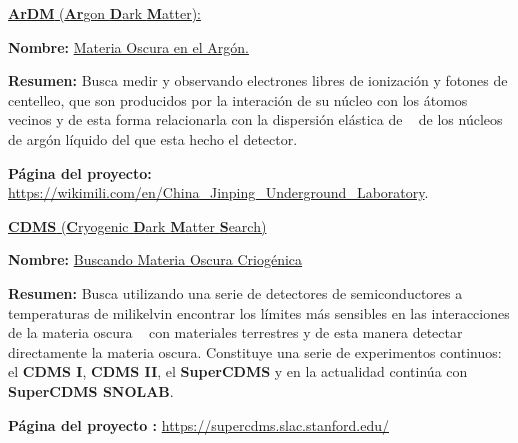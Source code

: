 \href{https://en.wikipedia.org/wiki/ArDM}{\textbf{ArDM} (\textbf{Ar}gon \textbf{D}ark \textbf{M}atter): }
\begin{itemize_f}
\item \textbf{Nombre:} \href{https://en.wikipedia.org/wiki/ArDM}{Materia Oscura en el Argón.}
\item \textbf{Resumen:} Busca medir y observando electrones libres de ionización y fotones de centelleo, que son producidos por la interación de su núcleo con los átomos vecinos y de esta forma relacionarla con la dispersión elástica de \WIMP ~ de los núcleos de argón líquido del que esta hecho el detector.
\item \textbf{Página del proyecto:} \href{https://wikimili.com/en/China_Jinping_Underground_Laboratory}{https://wikimili.com/en/China\_Jinping\_Under\-ground\_La\-bo\-ra\-to\-ry}.
\end{itemize_f}


\href{https://en.wikipedia.org/wiki/Cryogenic_Dark_Matter_Search}{\textbf{CDMS} (\textbf{C}ryogenic \textbf{D}ark \textbf{M}atter \textbf{S}earch)}
\begin{itemize_f}
\item \textbf{Nombre:} \href{https://en.wikipedia.org/wiki/Cryogenic_Dark_Matter_Search}{Buscando Materia Oscura Criogénica}
\item \textbf{Resumen:} Busca utilizando una serie de detectores de semiconductores a temperaturas de milikelvin encontrar los límites más sensibles en las interacciones de la materia oscura \WIMP~  con materiales terrestres y de esta manera detectar directamente la materia oscura. Constituye una serie de experimentos continuos: el \textbf{CDMS I}, \textbf{CDMS II}, el \textbf{SuperCDMS} y en la actualidad continúa con \textbf{SuperCDMS SNOLAB}.
\item \textbf{Página del proyecto :} \href{https://supercdms.slac.stanford.edu/}{https://supercdms.slac.stanford.edu/}
\end{itemize_f}

